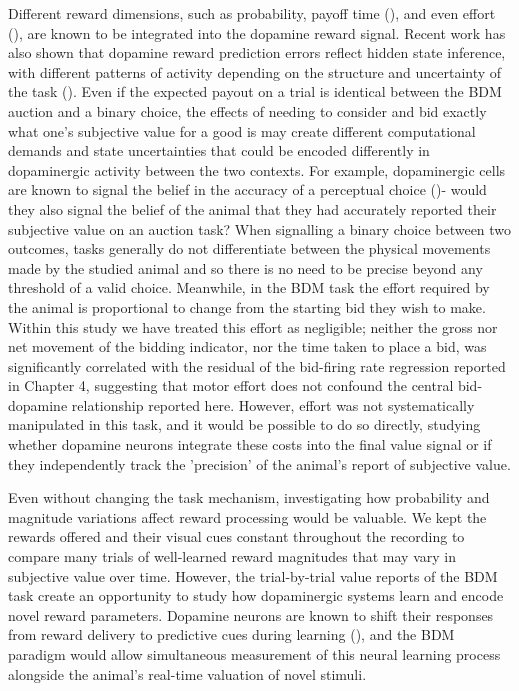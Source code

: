 Different reward dimensions, such as probability, payoff time (\cite{lakDopaminePredictionError2014}), and even effort (\cite{burrellWorthWorkMonkeys2023}), are known to be integrated into the dopamine reward signal. Recent work has also shown that dopamine reward prediction errors reflect hidden state inference, with different patterns of activity depending on the structure and uncertainty of the task (\cite{starkweatherDopamineRewardPrediction2017}). Even if the expected payout on a trial is identical between the BDM auction and a binary choice, the effects of needing to consider and bid exactly what one's subjective value for a good is may create different computational demands and state uncertainties that could be encoded differently in dopaminergic activity between the two contexts. For example, dopaminergic cells are known to signal the belief in the accuracy of a perceptual choice (\cite{lakMidbrainDopamineNeurons2017})- would they also signal the belief of the animal that they had accurately reported their subjective value on an auction task? When signalling a binary choice between two outcomes, tasks generally do not differentiate between the physical movements made by the studied animal and so there is no need to be precise beyond any threshold of a valid choice. Meanwhile, in the BDM task the effort required by the animal is proportional to change from the starting bid they wish to make. Within this study we have treated this effort as negligible; neither the gross nor net movement of the bidding indicator, nor the time taken to place a bid, was significantly correlated with the residual of the bid-firing rate regression reported in Chapter 4, suggesting that motor effort does not confound the central bid-dopamine relationship reported here. However, effort was not systematically manipulated in this task, and it would be possible to do so directly, studying whether dopamine neurons integrate these costs into the final value signal or if they independently track the 'precision' of the animal's report of subjective value.

Even without changing the task mechanism, investigating how probability and magnitude variations affect reward processing would be valuable. We kept the rewards offered and their visual cues constant throughout the recording to compare many trials of well-learned reward magnitudes that may vary in subjective value over time. However, the trial-by-trial value reports of the BDM task create an opportunity to study how dopaminergic systems learn and encode novel reward parameters. Dopamine neurons are known to shift their responses from reward delivery to predictive cues during learning (\cite{ljungbergResponsesMonkeyDopamine1992}), and the BDM paradigm would allow simultaneous measurement of this neural learning process alongside the animal's real-time valuation of novel stimuli.

